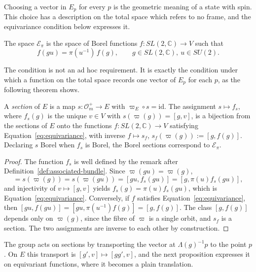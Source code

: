 Choosing a vector in $E_p$ for every $p$ is the geometric meaning of a state with spin. This choice has a description on the total space which refers to no frame, and the equivariance condition below expresses it.

\begin{definition}\label{def:equivariant}
	The space $\mathcal{E}_\pi$ is the space of Borel functions $f:SL(2,\mathbb{C})\to V$ such that
	\begin{equation}\label{eq:equivariance}
		f(gu)=\pi(u^{-1})\,f(g),\qquad g\in SL(2,\mathbb{C}),\ u\in SU(2).
	\end{equation}
\end{definition}

The condition is not an ad hoc requirement. It is exactly the condition under which a function on the total space records one vector of $E_p$ for each $p$, as the following theorem shows.

\begin{theorem}\label{thm:equivariant-sections}
	A \emph{section} of $E$ is a map $s:\mathcal{O}_m^+\to E$ with $\varpi_E\circ s=\mathrm{id}$. The assignment $s\mapsto f_s$, where $f_s(g)$ is the unique $v\in V$ with $s(\varpi(g))=[g,v]$, is a bijection from the sections of $E$ onto the functions $f:SL(2,\mathbb{C})\to V$ satisfying Equation~\eqref{eq:equivariance}, with inverse $f\mapsto s_f$, $s_f(\varpi(g)):=[g,f(g)]$. Declaring $s$ Borel when $f_s$ is Borel, the Borel sections correspond to $\mathcal{E}_\pi$.
\end{theorem}

\begin{proof}
	The function $f_s$ is well defined by the remark after Definition~\ref{def:associated-bundle}. Since $\varpi(gu)=\varpi(g)$,
	\begin{equation*}
		[g,f_s(g)]=s(\varpi(g))=s(\varpi(gu))=[gu,f_s(gu)]=[g,\pi(u)f_s(gu)],
	\end{equation*}
	and injectivity of $v\mapsto[g,v]$ yields $f_s(g)=\pi(u)f_s(gu)$, which is Equation~\eqref{eq:equivariance}. Conversely, if $f$ satisfies Equation~\eqref{eq:equivariance}, then $[gu,f(gu)]=[gu,\pi(u^{-1})f(g)]=[g,f(g)]$. The class $[g,f(g)]$ depends only on $\varpi(g)$, since the fibre of $\varpi$ is a single orbit, and $s_f$ is a section. The two assignments are inverse to each other by construction.
\end{proof}

The group acts on sections by transporting the vector at $\Lambda(g)^{-1}p$ to the point $p$. On $E$ this transport is $[g',v]\mapsto[gg',v]$, and the next proposition expresses it on equivariant functions, where it becomes a plain translation.

